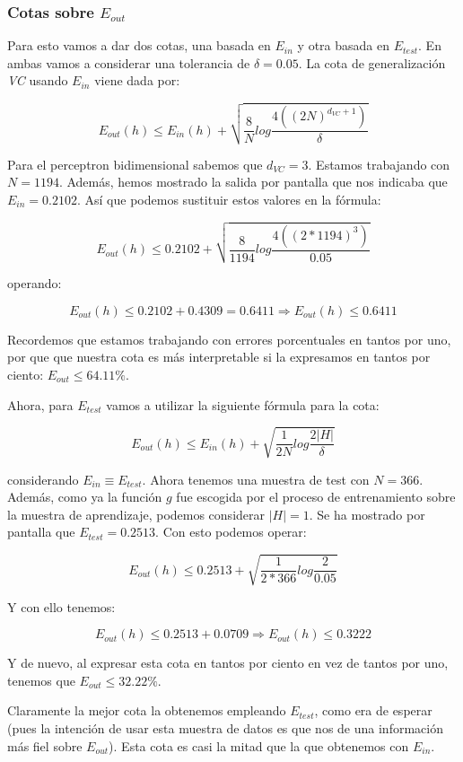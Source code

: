 \documentclass[11pt]{article}
\begin{document}
\subsubsection{Cotas sobre $E_{out}$}

Para esto vamos a dar dos cotas, una basada en $E_{in}$ y otra basada en $E_{test}$. En ambas vamos a considerar una tolerancia de $\delta = 0.05$. La cota de generalización \emph{VC} usando $E_{in}$ viene dada por:

$$E_{out}(h) \leq E_{in}(h) + \sqrt{\frac{8}{N} log\frac{4((2N)^{d_{VC} + 1})}{\delta}}$$

Para el perceptron bidimensional sabemos que $d_{VC} = 3$. Estamos trabajando con $N = 1194$. Además, hemos mostrado la salida por pantalla que nos indicaba que $E_{in} = 0.2102$. Así que podemos sustituir estos valores en la fórmula:

$$E_{out}(h) \leq 0.2102 + \sqrt{\frac{8}{1194} log\frac{4((2 * 1194)^{3})}{0.05}}$$

operando:

$$E_{out}(h) \leq 0.2102 + 0.4309 = 0.6411 \Rightarrow E_{out}(h) \leq 0.6411$$

Recordemos que estamos trabajando con errores porcentuales en tantos por uno, por que que nuestra cota es más interpretable si la expresamos en tantos por ciento: $E_{out} \leq 64.11\%$.

Ahora, para $E_{test}$ vamos a utilizar la siguiente fórmula para la cota:

$$E_{out}(h) \leq E_{in}(h) + \sqrt{\frac{1}{2N} log\frac{2|H|}{\delta}}$$

considerando $E_{in} \equiv E_{test}$. Ahora tenemos una muestra de test con $N = 366$. Además, como ya la función $g$ fue escogida por el proceso de entrenamiento sobre la muestra de aprendizaje, podemos considerar $|H| = 1$. Se ha mostrado por pantalla que $E_{test} = 0.2513$. Con esto podemos operar:

$$E_{out}(h) \leq 0.2513 + \sqrt{\frac{1}{2 * 366} log\frac{2}{0.05}}$$

Y con ello tenemos:

$$E_{out}(h) \leq 0.2513 + 0.0709 \Rightarrow E_{out}(h) \leq 0.3222$$

Y de nuevo, al expresar esta cota en tantos por ciento en vez de tantos por uno, tenemos que $E_{out} \leq 32.22\%$.

Claramente la mejor cota la obtenemos empleando $E_{test}$, como era de esperar (pues la intención de usar esta muestra de datos es que nos de una información más fiel sobre $E_{out}$). Esta cota es casi la mitad que la que obtenemos con $E_{in}$.

\pagebreak
\end{document}
